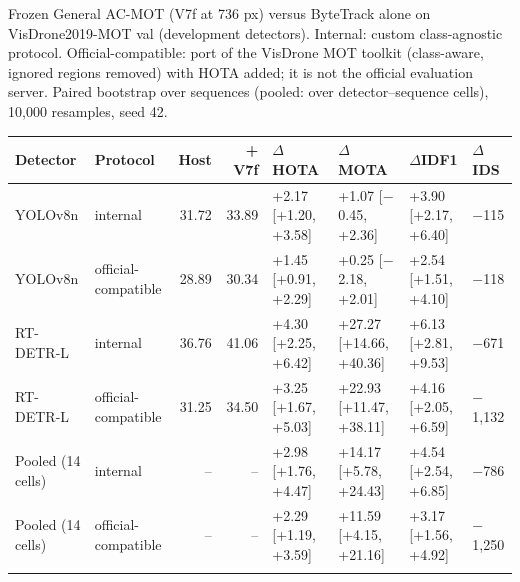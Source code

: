 \begin{tableorg}[!htbp]
\centering
\caption{Frozen General AC-MOT (V7f at 736 px) versus ByteTrack alone on VisDrone2019-MOT val (development detectors). Internal: custom class-agnostic protocol. Official-compatible: port of the VisDrone MOT toolkit (class-aware, ignored regions removed) with HOTA added; it is not the official evaluation server. Paired bootstrap over sequences (pooled: over detector--sequence cells), 10,000 resamples, seed 42.}
\label{tab:visdrone_official}
\footnotesize
\setlength\tabcolsep{3.5pt}
\begin{adjustbox}{max width=\linewidth}
\begin{tabular}{llrrllll}
\toprule
Detector & Protocol & Host & + V7f & $\Delta$HOTA & $\Delta$MOTA & $\Delta$IDF1 & $\Delta$IDS \\
\midrule
YOLOv8n & internal & 31.72 & 33.89 & +2.17 [+1.20, +3.58] & +1.07 [\ensuremath{-}0.45, +2.36] & +3.90 [+2.17, +6.40] & \ensuremath{-}115 \\
YOLOv8n & official-compatible & 28.89 & 30.34 & +1.45 [+0.91, +2.29] & +0.25 [\ensuremath{-}2.18, +2.01] & +2.54 [+1.51, +4.10] & \ensuremath{-}118 \\
RT-DETR-L & internal & 36.76 & 41.06 & +4.30 [+2.25, +6.42] & +27.27 [+14.66, +40.36] & +6.13 [+2.81, +9.53] & \ensuremath{-}671 \\
RT-DETR-L & official-compatible & 31.25 & 34.50 & +3.25 [+1.67, +5.03] & +22.93 [+11.47, +38.11] & +4.16 [+2.05, +6.59] & \ensuremath{-}1,132 \\
Pooled (14 cells) & internal & -- & -- & +2.98 [+1.76, +4.47] & +14.17 [+5.78, +24.43] & +4.54 [+2.54, +6.85] & \ensuremath{-}786 \\
Pooled (14 cells) & official-compatible & -- & -- & +2.29 [+1.19, +3.59] & +11.59 [+4.15, +21.16] & +3.17 [+1.56, +4.92] & \ensuremath{-}1,250 \\
\botrule
\end{tabular}
\end{adjustbox}
\end{tableorg}

